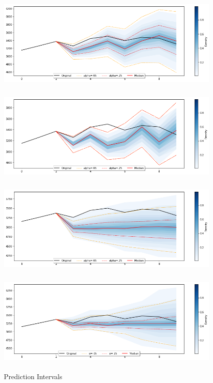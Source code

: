 \begin{figure}
\begin{center}
\begin{subfloat}{
\includegraphics[width=6in,height=1.8in]{figures/arima.png}
\label{fig:arima}}
\end{subfloat}

\begin{subfloat}{
\includegraphics[width=6in,height=1.8in]{figures/qar.png}
\label{fig:qar}}
\end{subfloat}

\begin{subfloat}{
\includegraphics[width=6in,height=1.8in]{figures/bsts.png}
\label{fig:bsts}}
\end{subfloat}

\begin{subfloat}{
\includegraphics[width=6in,height=1.8in]{figures/knn.png}
\label{fig:knn}}
\end{subfloat}

\caption{Prediction Intervals}
\label{fig:prediction_intervals}
\end{center}
\end{figure}

